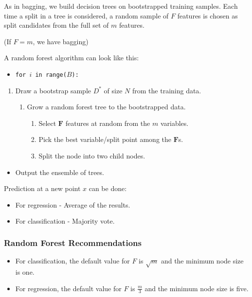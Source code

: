 \bigskip
As in bagging, we build decision trees on bootstrapped training samples.
Each time a split in a tree is considered, a random sample of $F$ features is chosen as split candidates from the full set of $m$ features.

(If $F=m$, we have bagging)

\bigskip
A random forest algorithm can look like this:
\begin{itemize}
    \item \texttt{for $i$ in range($B$):}
\end{itemize}
\begin{enumerate}
    \item Draw a bootstrap sample $D^{*}$ of size $N$ from the training data.
    \begin{enumerate}
        \item Grow a random forest tree to the bootstrapped data.
        \begin{enumerate}
            \item Select $\bm{F}$ features at random from the $m$ variables.
            \item Pick the best variable/split point among the $\bm{F}$s.
            \item Split the node into two child nodes.
        \end{enumerate}
    \end{enumerate}
\end{enumerate}
\begin{itemize}
    \item Output the ensemble of trees.
\end{itemize}

Prediction at a new point $x$ can be done:
\begin{itemize}
    \item For regression - Average of the results.
    \item For classification - Majority vote.
\end{itemize}

\subsubsection{Random Forest Recommendations}
\begin{itemize}
    \item For classification, the default value for $F$ is $\sqrt{m}$ and the minimum node size is one.
    \item For regression, the default value for $F$ is $\frac{m}{3}$ and the minimum node size is five.
\end{itemize}
